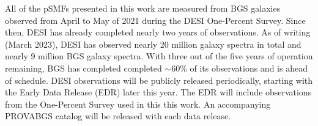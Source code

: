 All of the pSMFs presented in this work are measured from BGS galaxies observed
from April to May of 2021 during the DESI One-Percent Survey.
Since then, DESI has already completed nearly two years of observations.
As of writing (March 2023), DESI has observed nearly 20 million galaxy spectra
in total and nearly 9 million BGS galaxy spectra.  
With three out of the five years of operation remaining, BGS has completed
completed $\sim$60\% of its observations and is ahead of schedule.  
DESI observations will be publicly released periodically, starting with the
Early Data Release (EDR) later this year. 
The EDR will include observations from the One-Percent Survey used in this
this work. 
An accompanying PROVABGS catalog will be released with each data release.
